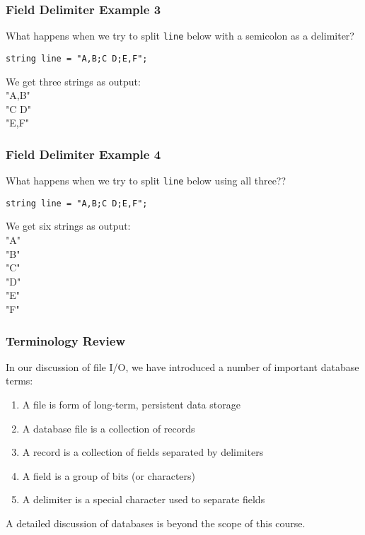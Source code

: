 \begin{frame}[fragile]
\frametitle{Field Delimiter Example 3}

What happens when we try to split \texttt{line} below with a semicolon as a delimiter?

\begin{verbatim}
string line = "A,B;C D;E,F";
\end{verbatim}

We get three strings as output:\\
\quad "A,B"\\
\quad "C D"\\
\quad "E,F"

\end{frame}

\begin{frame}[fragile]
\frametitle{Field Delimiter Example 4}

What happens when we try to split \texttt{line} below using all three??

\begin{verbatim}
string line = "A,B;C D;E,F";
\end{verbatim}

We get six strings as output:\\
\quad "A"\\
\quad "B"\\
\quad "C"\\
\quad "D"\\
\quad "E"\\
\quad "F"

\end{frame}

\begin{frame}
\frametitle{Terminology Review}

In our discussion of file I/O, we have introduced a number of important database terms:
\begin{enumerate}
\item A \alert{file} is form of long-term, persistent data storage
\item A \alert{database file} is a collection of records
\item A \alert{record} is a collection of fields separated by delimiters
\item A \alert{field} is a group of bits (or characters)
\item A \alert{delimiter} is a special character used to separate fields
\end{enumerate}

A detailed discussion of databases is beyond the scope of this course.

\end{frame}



